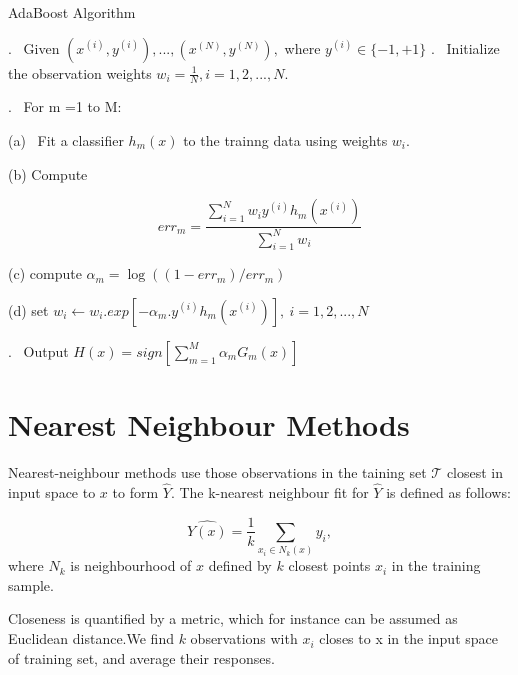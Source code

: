 \documentclass[12pt]{article}
\begin{document}
 
 \begin{algorithm}
 	
 	\caption*{AdaBoost Algorithm} \label{alg:MyAlgorithm}
 	\begin{algorithmic}
 		
 		. \ Given $(x^{(i)},y^{(i)}),...,(x^{(N)},y^{(N)}),$ where $y^{(i)}\in \{-1,+1\}$ 
 		. \  Initialize the observation weights $w_{i}= \frac{1}{N},i = 1,2,...,N.$
 		
 		. \ For m =1 to M:
 		
 		
 		
 		\STATE \hspace{ 0.8cm}(a) \ Fit a classifier $h_{m}(x)$ to the trainng data using weights $w_{i}.$
 		
 		\STATE \hspace{ 0.8cm}(b) Compute 
 		
 	
 		
 			$$err_{m} = \frac{\sum_{i=1}^{N}w_{i}y^{(i)}h_{m}(x^{(i)})}{\sum_{i=1}^{N} w_{i}}$$
 		
 		
 		
 			\STATE \hspace{ 0.8cm}(c) compute $\alpha_{m} = \log((1-err_{m})/err_{m})$
 			
 				\STATE \hspace{ 0.8cm}(d) set $w_{i} \leftarrow w_{i}.exp[-\alpha_{m}.y^{(i)}h_{m}(x^{(i)})], \ i = 1,2,...,N$
 				
 	. \ Output $H(x) = sign[\sum_{m=1}^{M}\alpha_{m}G_{m}(x)]$
 		
 		
 	\end{algorithmic}
 \end{algorithm}
 
 
 
 
 
 \section{Nearest Neighbour Methods}
 
 Nearest-neighbour methods use those observations in the taining set $\mathcal{T}$ closest in input space to $x$ to form $\hat{Y}$.
 The k-nearest neighbour fit for $\hat{Y}$ is defined as follows:
 
 $$\hat{Y(x)} = \frac{1}{k}\sum_{x_{i} \in N_{k}(x)} y_{i},$$ where $N_{k}$ is neighbourhood of $x$ defined by $k$ closest points $x_{i}$ in the training sample.
 
 Closeness is quantified by a metric, which for instance can be assumed as Euclidean distance.We find $k$ observations with $x_{i}$ closes to x in the input space of training set, and average their responses.
 
\end{document}
